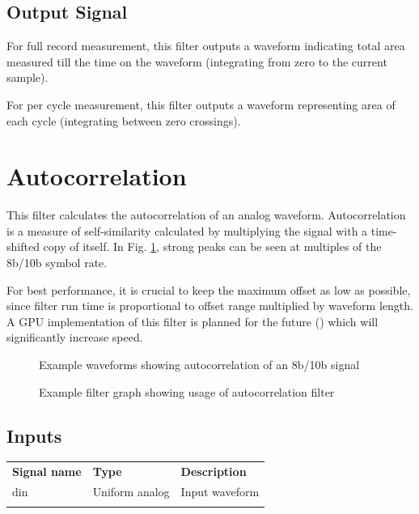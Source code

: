 \subsection{Output Signal}

For full record measurement, this filter outputs a waveform indicating total area measured till the time on the
waveform (integrating from zero to the current sample).

For per cycle measurement, this filter outputs a waveform representing area of each cycle (integrating between zero
crossings).

\FloatBarrier
\pagebreak
\section{Autocorrelation}
\label{filter:autocorrelation}

This filter calculates the autocorrelation of an analog waveform. Autocorrelation is a measure of self-similarity
calculated by multiplying the signal with a time-shifted copy of itself. In Fig. \ref{filter_autocorrelation}, strong peaks
can be seen at multiples of the 8b/10b symbol rate.

For best performance, it is crucial to keep the maximum offset as low as possible, since filter run time is
proportional to offset range multiplied by waveform length. A GPU implementation of this filter is planned for the
future () which will significantly increase speed.

\begin{figure}[h]
\centering
{}
\caption{Example waveforms showing autocorrelation of an 8b/10b signal}
\label{filter_autocorrelation}
\end{figure}

\begin{figure}[h]
\centering
{}
\caption{Example filter graph showing usage of autocorrelation filter}
\label{filter_graph_autocorrelation}
\end{figure}
\FloatBarrier

\subsection{Inputs}

\begin{tabularx}{16cm}{llX}
\thickhline
\textbf{Signal name} & \textbf{Type} & \textbf{Description} \\
\thickhline
din & Uniform analog & Input waveform \\
\thickhline
\end{tabularx}

